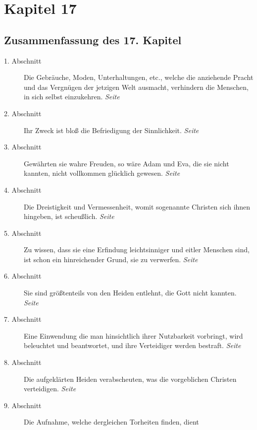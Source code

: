 
\chapter{Kapitel 17} \label{kap17}
\section{Zusammenfassung des 17. Kapitel}

\begin{description}
\item[1. Abschnitt] Die Gebräuche, Moden, Unterhaltungen, etc., welche die
anziehende Pracht und das Vergnügen der jetzigen Welt ausmacht, verhindern die
Menschen, in sich selbst einzukehren.
\dotfill \textit{Seite~\pageref{kap17_ab1}}\\
\item[2. Abschnitt] Ihr Zweck ist bloß die Befriedigung der Sinnlichkeit.
\dotfill \textit{Seite~\pageref{kap17_ab2}}\\
\item[3. Abschnitt] Gewährten sie wahre Freuden, so wäre Adam und Eva, die sie
nicht kannten, nicht vollkommen glücklich gewesen.
\dotfill \textit{Seite~\pageref{kap17_ab3}}\\
\item[4. Abschnitt] Die Dreistigkeit und Vermessenheit, womit sogenannte
Christen sich ihnen hingeben, ist scheußlich.
\dotfill \textit{Seite~\pageref{kap17_ab4}}\\
\item[5. Abschnitt] Zu wissen, dass sie eine Erfindung leichtsinniger und eitler
Menschen sind, ist schon ein hinreichender Grund, sie zu verwerfen.
\dotfill \textit{Seite~\pageref{kap17_ab5}}\\
\item[6. Abschnitt] Sie sind größtenteils von den Heiden entlehnt, die Gott
nicht kannten.
\dotfill \textit{Seite~\pageref{kap17_ab6}}\\
\item[7. Abschnitt] Eine Einwendung die man hinsichtlich ihrer Nutzbarkeit
vorbringt, wird beleuchtet und beantwortet, und ihre Verteidiger werden
bestraft.
\dotfill \textit{Seite~\pageref{kap17_ab7}}\\
\item[8. Abschnitt] Die aufgeklärten Heiden verabscheuten, was die vorgeblichen
Christen verteidigen.
\dotfill \textit{Seite~\pageref{kap17_ab8}}\\
\item[9. Abschnitt] Die Aufnahme, welche dergleichen Torheiten finden, dient

\end{description}
